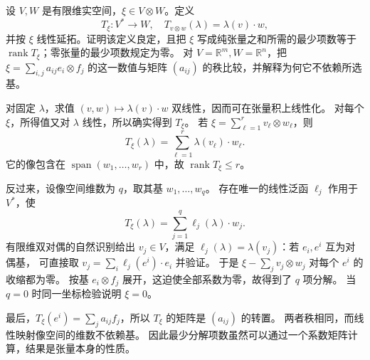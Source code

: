 \begin{exercise}\label{b1:ex:app-b-tensor-rank}
设 \(V,W\) 是有限维实空间，\(\xi\in V\otimes W\)。定义
\[
 T_\xi:V^*\longrightarrow W,\quad
 T_{v\otimes w}(\lambda)=\lambda(v)\cdot w,
\]
并按 \(\xi\) 线性延拓。证明该定义良定，且把 \(\xi\) 写成纯张量之和所需的最少项数等于 \(\operatorname{rank}T_\xi\)；零张量的最少项数规定为零。
对 \(V=\mathbb R^m,W=\mathbb R^n\)，把
\(\xi=\sum_{i,j}a_{ij}e_i\otimes f_j\) 的这一数值与矩阵 \((a_{ij})\) 的秩比较，并解释为何它不依赖所选基。
\end{exercise}
\begin{solution}
对固定 \(\lambda\)，求值 \((v,w)\mapsto\lambda(v)\cdot w\) 双线性，因而可在张量积上线性化。
对每个 \(\xi\)，所得值又对 \(\lambda\) 线性，所以确实得到 \(T_\xi\)。
若 \(\xi=\sum_{\ell=1}^r v_\ell\otimes w_\ell\)，则
\[
 T_\xi(\lambda)=\sum_{\ell=1}^r\lambda(v_\ell)\cdot w_\ell.
\]
它的像包含在 \(\operatorname{span}(w_1,\ldots,w_r)\) 中，故
\(\operatorname{rank}T_\xi\leq r\)。

反过来，设像空间维数为 \(q\)，取其基 \(w_1,\ldots,w_q\)。
存在唯一的线性泛函 \(\ell_j\) 作用于 \(V^*\)，使
\[
 T_\xi(\lambda)=\sum_{j=1}^q\ell_j(\lambda)\cdot w_j.
\]
有限维双对偶的自然识别给出 \(v_j\in V\)，满足
\(\ell_j(\lambda)=\lambda(v_j)\)：若 \(e_i,e^i\) 互为对偶基，
可直接取 \(v_j=\sum_i\ell_j(e^i)\cdot e_i\) 并验证。
于是 \(\xi-\sum_jv_j\otimes w_j\) 对每个 \(e^i\) 的收缩都为零。
按基 \(e_i\otimes f_j\) 展开，这迫使全部系数为零，故得到了 \(q\) 项分解。
当 \(q=0\) 时同一坐标检验说明 \(\xi=0\)。

最后，\(T_\xi(e^i)=\sum_ja_{ij}f_j\)，所以 \(T_\xi\) 的矩阵是 \((a_{ij})\) 的转置。
两者秩相同，而线性映射像空间的维数不依赖基。
因此最少分解项数虽然可以通过一个系数矩阵计算，结果是张量本身的性质。
\end{solution}

